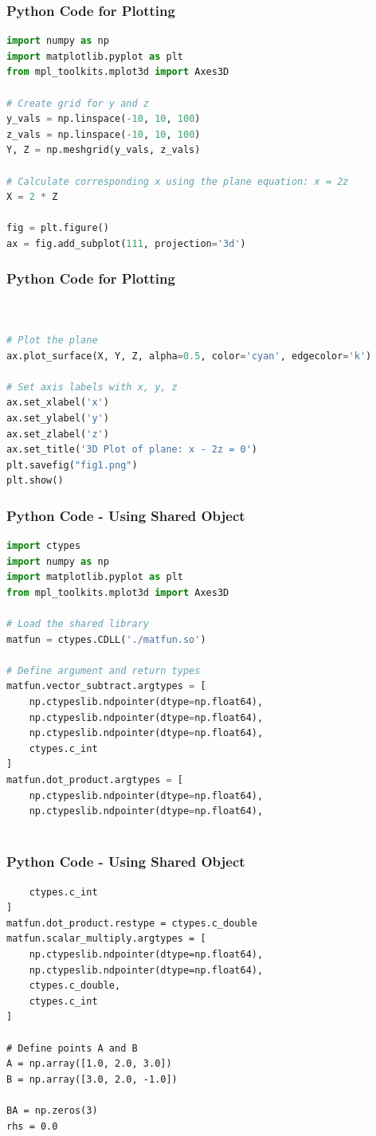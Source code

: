 \documentclass{beamer}
\numberwithin{equation}{section}
\begin{document}
\begin{frame}[fragile]
\frametitle{Python Code for Plotting}
\begin{lstlisting}[language=Python]
import numpy as np
import matplotlib.pyplot as plt
from mpl_toolkits.mplot3d import Axes3D

# Create grid for y and z
y_vals = np.linspace(-10, 10, 100)
z_vals = np.linspace(-10, 10, 100)
Y, Z = np.meshgrid(y_vals, z_vals)

# Calculate corresponding x using the plane equation: x = 2z
X = 2 * Z

fig = plt.figure()
ax = fig.add_subplot(111, projection='3d')


\end{lstlisting}

\end{frame}
\begin{frame}[fragile]
\frametitle{Python Code for Plotting}
\begin{lstlisting}[language=Python]


# Plot the plane
ax.plot_surface(X, Y, Z, alpha=0.5, color='cyan', edgecolor='k')

# Set axis labels with x, y, z
ax.set_xlabel('x')
ax.set_ylabel('y')
ax.set_zlabel('z')
ax.set_title('3D Plot of plane: x - 2z = 0')
plt.savefig("fig1.png")
plt.show()

\end{lstlisting}

\end{frame}
\begin{frame}[fragile]
\frametitle{Python Code - Using Shared Object}
\begin{lstlisting}[language=Python]
import ctypes
import numpy as np
import matplotlib.pyplot as plt
from mpl_toolkits.mplot3d import Axes3D

# Load the shared library
matfun = ctypes.CDLL('./matfun.so')

# Define argument and return types
matfun.vector_subtract.argtypes = [
    np.ctypeslib.ndpointer(dtype=np.float64),
    np.ctypeslib.ndpointer(dtype=np.float64),
    np.ctypeslib.ndpointer(dtype=np.float64),
    ctypes.c_int
]
matfun.dot_product.argtypes = [
    np.ctypeslib.ndpointer(dtype=np.float64),
    np.ctypeslib.ndpointer(dtype=np.float64),
    
\end{lstlisting}

\end{frame}
\begin{frame}[fragile]
    \frametitle{Python Code - Using Shared Object}
    \begin{lstlisting}
    ctypes.c_int
]
matfun.dot_product.restype = ctypes.c_double
matfun.scalar_multiply.argtypes = [
    np.ctypeslib.ndpointer(dtype=np.float64),
    np.ctypeslib.ndpointer(dtype=np.float64),
    ctypes.c_double,
    ctypes.c_int
]

# Define points A and B
A = np.array([1.0, 2.0, 3.0])
B = np.array([3.0, 2.0, -1.0])

BA = np.zeros(3)
rhs = 0.0
\end{lstlisting}
\end{frame}
\end{document}
